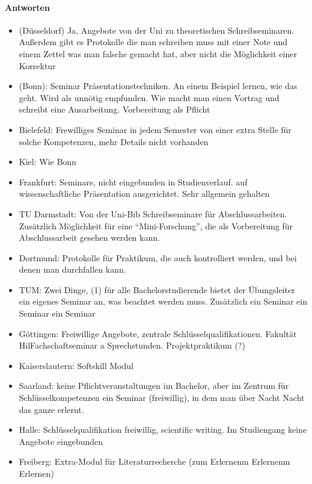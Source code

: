       \paragraph{Antworten}
        \begin{itemize}
          \item (Düsseldorf) Ja, Angebote von der Uni zu theoretischen Schreibseminaren. Außerdem gibt es Protokolle die man schreiben muss mit einer Note und einem Zettel was man falsche gemacht hat, aber nicht die Möglichkeit einer Korrektur
          \item (Bonn): Seminar Präsentationstechniken. An einem Beispiel lernen, wie das geht. Wird als unnötig empfunden. Wie macht man einen Vortrag und schreibt eine Ausarbeitung. Vorbereitung als Pflicht
          \item Bielefeld: Frewilliges Seminar in jedem Semester von einer extra Stelle für solche Kompetenzen, mehr Details nicht vorhanden
          \item Kiel: Wie Bonn
          \item Frankfurt: Seminare, nicht eingebunden in Studienverlauf. auf wissenschaftliche Präsentation ausgerichtet. Sehr allgemein gehalten
          \item TU Darmstadt: Von der Uni-Bib Schreibseminare für Abschlussarbeiten. Zusätzlich Möglichkeit für eine “Mini-Forschung”, die als Vorbereitung für Abschlussarbeit gesehen werden kann.
          \item Dortmund: Protokolle für Praktikum, die auch kontrolliert werden, und bei denen man durchfallen kann.
          \item TUM: Zwei Dinge, (1) für alle Bachelorstudierende bietet der Übungsleiter ein eigenes Seminar an, was beachtet werden muss. Zusätzlich ein Seminar ein Seminar ein Seminar
          \item Göttingen: Freiwillige Angebote, zentrale Schlüsselqualifikationen. Fakultät HilFachschaftseminar a Sprechstunden. Projektpraktikum (?)
          \item Kaiserslautern: Softskill Modul
          \item Saarland: keine Pflichtveranstaltungen im Bachelor, aber im Zentrum für Schlüsselkompetenzen ein Seminar (freiwillig), in dem man über Nacht Nacht das ganze erlernt.
          \item Halle: Schlüsselqualifikation freiwillig, scientific writing. Im Studiengang keine Angebote eingebunden
          \item Freiberg: Extra-Modul für Literaturrecherche (zum Erlernenm Erlernenm Erlernen)

\end{itemize}
